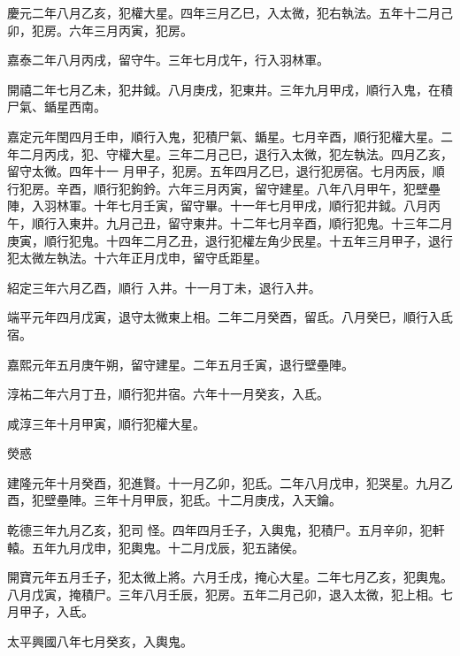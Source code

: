 \begin{pinyinscope}
 慶元二年八月乙亥，犯權大星。四年三月乙巳，入太微，犯右執法。五年十二月己卯，犯房。六年三月丙寅，犯房。



 嘉泰二年八月丙戌，留守牛。三年七月戊午，行入羽林軍。



 開禧二年七月乙未，犯井鉞。八月庚戌，犯東井。三年九月甲戌，順行入鬼，在積尸氣、鍎星西南。



 嘉定元年閏四月壬申，順行入鬼，犯積尸氣、鍎星。七月辛酉，順行犯權大星。二年二月丙戌，犯、守權大星。三年二月己巳，退行入太微，犯左執法。四月乙亥，留守太微。四年十一
 月甲子，犯房。五年四月乙巳，退行犯房宿。七月丙辰，順行犯房。辛酉，順行犯鉤鈐。六年三月丙寅，留守建星。八年八月甲午，犯壁壘陣，入羽林軍。十年七月壬寅，留守畢。十一年七月甲戌，順行犯井鉞。八月丙午，順行入東井。九月己丑，留守東井。十二年七月辛酉，順行犯鬼。十三年二月庚寅，順行犯鬼。十四年二月乙丑，退行犯權左角少民星。十五年三月甲子，退行犯太微左執法。十六年正月戊申，留守氐距星。



 紹定三年六月乙酉，順行
 入井。十一月丁未，退行入井。



 端平元年四月戊寅，退守太微東上相。二年二月癸酉，留氐。八月癸巳，順行入氐宿。



 嘉熙元年五月庚午朔，留守建星。二年五月壬寅，退行壁壘陣。



 淳祐二年六月丁丑，順行犯井宿。六年十一月癸亥，入氐。



 咸淳三年十月甲寅，順行犯權大星。



 熒惑



 建隆元年十月癸酉，犯進賢。十一月乙卯，犯氐。二年八月戊申，犯哭星。九月乙酉，犯壁壘陣。三年十月甲辰，犯氐。十二月庚戌，入天鑰。



 乾德三年九月乙亥，犯司
 怪。四年四月壬子，入輿鬼，犯積尸。五月辛卯，犯軒轅。五年九月戊申，犯輿鬼。十二月戊辰，犯五諸侯。



 開寶元年五月壬子，犯太微上將。六月壬戌，掩心大星。二年七月乙亥，犯輿鬼。八月戊寅，掩積尸。三年八月壬辰，犯房。五年二月己卯，退入太微，犯上相。七月甲子，入氐。



 太平興國八年七月癸亥，入輿鬼。




\end{pinyinscope}
